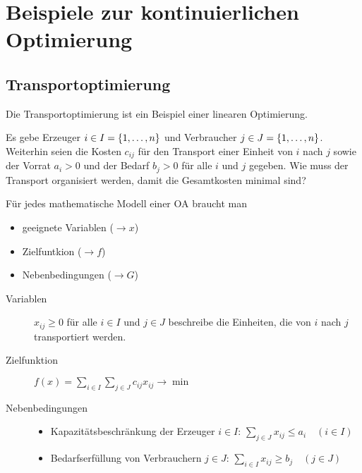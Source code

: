 \section{Beispiele zur kontinuierlichen Optimierung}

\subsection{Transportoptimierung}

Die Transportoptimierung ist ein Beispiel einer linearen Optimierung.

Es gebe Erzeuger $i \in I = \left\{ 1, \dots , n \right\}$ und Verbraucher $j \in J = \left\{ 1, \dots , n \right\}$. Weiterhin seien die Kosten $c_{ij}$ für den Transport einer Einheit von $i$ nach $j$ sowie der Vorrat $a_i > 0$ und der Bedarf $b_j > 0$ für alle $i$ und $j$ gegeben. Wie muss der Transport organisiert werden, damit die Gesamtkosten minimal sind?

Für jedes mathematische Modell einer OA braucht man
\begin{itemize}[nolistsep, topsep=-\parskip]
	\item geeignete Variablen ($\to x$)
	\item Zielfuntkion ($\to f$)
	\item Nebenbedingungen ($\to G$)
\end{itemize}

\begin{description}
	\item[Variablen] $x_{ij} \ge 0$ für alle $i \in I$ und $j \in J$ beschreibe die Einheiten, die von $i$ nach $j$ transportiert werden.
	\item[Zielfunktion] $f(x) = \sum\limits_{i \in I} \sum\limits_{j \in J} c_{ij} x_{ij} \to \min$
	\item[Nebenbedingungen] \leavevmode
	\begin{itemize}[nolistsep, topsep=-\parskip]
		\item Kapazitätsbeschränkung der Erzeuger $i \in I$: $\sum\limits_{j \in J} x_{ij} \le a_i \quad (i \in I)$
		\item Bedarfserfüllung von Verbrauchern $j \in J$: $\sum\limits_{i \in I} x_{ij} \ge b_j \quad (j \in J) $
	\end{itemize}
\end{description}

